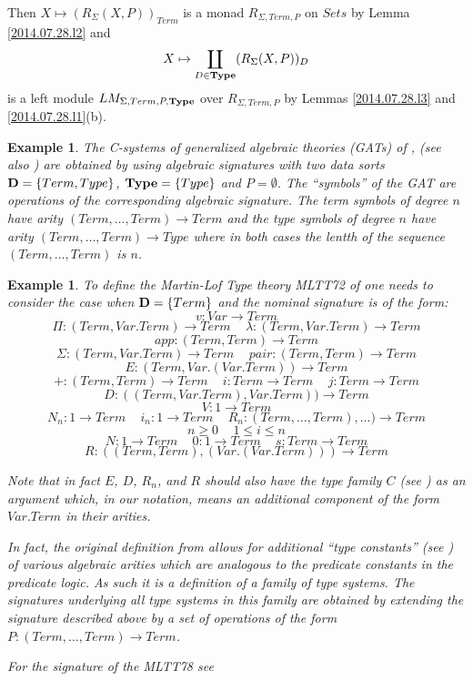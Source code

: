 \documentclass[11pt]{article}
\newtheorem{example}[proposition]{Example}
\newcommand{\llabel}[1]{\label{#1}}
\newcommand{\sr}{\rightarrow}
\newcommand{\spc}{{\,\,\,\,\,\,\,}}
\begin{document}
Then $X\mapsto (R_{\Sigma}(X,P))_{Term}$ is a monad $R_{\Sigma,Term,P}$ on $Sets$ by Lemma \ref{2014.07.28.l2} and 
%
$$X\mapsto \coprod_{D\in {\bf Type}} (R_{\Sigma}(X,P))_D$$
%
is a left module $LM_{\Sigma,Term,P,{\bf Type}}$ over $R_{\Sigma,Term,P}$ by Lemmas \ref{2014.07.28.l3} and \ref{2014.07.28.l1}(b). 
%
\begin{example}\rm
The C-systems of generalized algebraic theories (GATs) of \cite{Cartmell0},\cite{Cartmell1} (see also \cite{Garner}) are obtained by using algebraic signatures with two data sorts ${\bf D}=\{Term,Type\}$, ${\bf Type}=\{Type\}$ and $P=\emptyset$. The ``symbols'' of the GAT are operations of the corresponding algebraic signature. The term symbols of degree $n$ have arity $(Term,\dots,Term)\sr Term$ and the type symbols of degree $n$ have arity $(Term,\dots,Term)\sr Type$ where in both cases the lentth of the sequence $(Term,\dots,Term)$ is $n$. 
\end{example}
%
\begin{example}
\llabel{2014.08.ex}\rm
To define the Martin-Lof Type theory MLTT72 of \cite{ML72}  one needs to consider the case when ${\bf D}=\{Term\}$ and the nominal signature is of the form:
%
$$v:Var\sr Term$$
$$\Pi:(Term, Var.Term)\sr Term\spc\lambda:(Term,Var.Term)\sr Term$$ $$app:(Term,Term)\sr Term$$
$$\Sigma:(Term,Var.Term)\sr Term\spc pair:(Term,Term)\sr Term$$ $$E:(Term,Var.(Var.Term))\sr Term$$
$$+:(Term,Term)\sr Term\spc i:Term\sr Term\spc j:Term\sr Term$$ $$D:((Term,Var.Term),Var.Term))\sr Term$$
$$V:1\sr Term$$
$$N_n:1\sr Term\spc i_n:1\sr Term\spc R_n:(Term,\dots,Term),\dots)\sr Term$$ $$n\ge 0\spc 1\le i \le n$$
$$N:1\sr Term\spc 0:1\sr Term\spc s:Term\sr Term$$ $$R:((Term,Term),(Var.(Var.Term)))\sr Term$$

Note that in fact $E$, $D$, $R_n$, and $R$ should also have the type family $C$ (see \cite[2.3.6, 2.3.8, 2.3.10, 2.3.12]{ML72}) as an argument which, in our notation, means an additional component of the form $Var.Term$ in their arities.  

In fact, the original definition from \cite{ML72} allows for additional ``type constants'' (see \cite[2.2.1]{ML72}) of various algebraic arities which are analogous to the predicate constants in the predicate logic. As such it is a definition of a family of type systems. The signatures underlying all type systems in this family are obtained by extending the signature described above by a set of operations of the form $P:(Term,\dots,Term)\sr Term$. 

For the signature of the MLTT78 see \cite[p. 158]{ML78}
\end{example}
\end{document}
